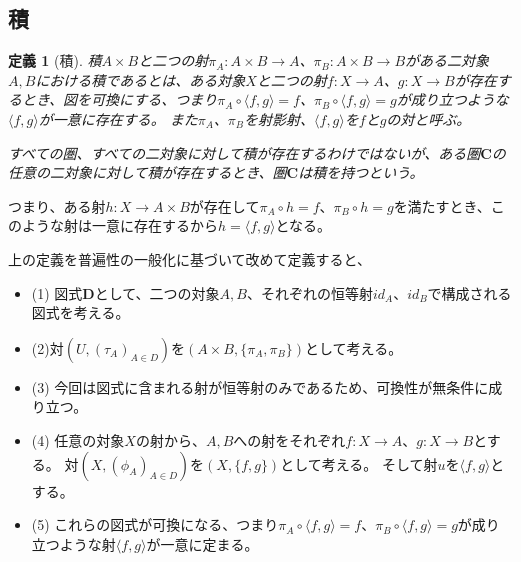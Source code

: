 \documentclass[dvipdfmx]{jsarticle}
\newcommand{\cat}[1]{\boldsymbol{#1}}
\newcommand{\arrow}{\rightarrow}
\newcommand{\tuple}[1]{\langle #1\rangle}
\newcommand{\mor}[3]{#1:#2\arrow #3}
\newtheorem{define}{定義}[section]
\numberwithin{proof}{subsection}
\numberwithin{prop}{subsection}
\numberwithin{define}{subsection}
\begin{document}
	\subsection{積}
	\begin{define}[積]

		積$A\times B$と二つの射$\mor{\pi_A}{A\times B}{A}$、$\mor{\pi_B}{A\times B}{B}$がある二対象$A,B$における積であるとは、ある対象$X$と二つの射$\mor{f}{X}{A}$、$\mor{g}{X}{B}$が存在するとき、図を可換にする、つまり$\pi_A\circ\tuple{f,g}=f$、$\pi_B\circ\tuple{f,g}=g$が成り立つような$\tuple{f,g}$が一意に存在する。
		また$\pi_A$、$\pi_B$を射影射、$\tuple{f,g}$を$f$と$g$の対と呼ぶ。

		すべての圏、すべての二対象に対して積が存在するわけではないが、ある圏$\cat{C}$の任意の二対象に対して積が存在するとき、圏$\cat{C}$は積を持つという。

		\begin{center}
		\end{center}
	\end{define}

	つまり、ある射$\mor{h}{X}{A\times B}$が存在して$\pi_A\circ h=f$、$\pi_B\circ h=g$を満たすとき、このような射は一意に存在するから$h=\tuple{f,g}$となる。

	上の定義を普遍性の一般化に基づいて改めて定義すると、
	\begin{itemize}
		\item (1)
		図式$\cat{D}$として、二つの対象$A,B$、それぞれの恒等射$id_A$、$id_B$で構成される図式を考える。
		\item (2)対$(U,(\tau_A)_{A\in D})$を$(A\times B,\{\pi_A,\pi_B\})$として考える。
		\item (3)
		今回は図式に含まれる射が恒等射のみであるため、可換性が無条件に成り立つ。
		\item (4)
		任意の対象$X$の射から、$A,B$への射をそれぞれ$\mor{f}{X}{A}$、$\mor{g}{X}{B}$とする。
		対$(X,(\phi_A)_{A\in D})$を$(X,\{f,g\})$として考える。
		そして射$u$を$\tuple{f,g}$とする。
		\item (5)
		これらの図式が可換になる、つまり$\pi_A\circ\tuple{f,g}=f$、$\pi_B\circ\tuple{f,g}=g$が成り立つような射$\tuple{f,g}$が一意に定まる。
	\end{itemize}
\end{document}
